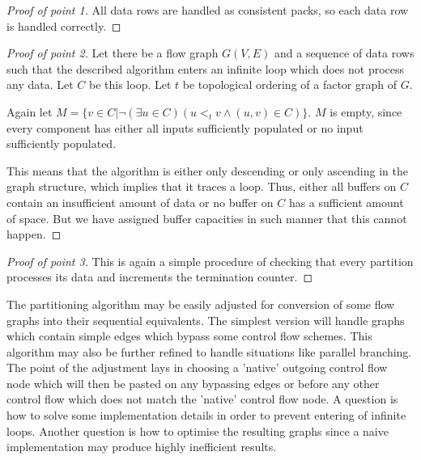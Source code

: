 \begin{proof}[Proof of point 1]
  All data rows are handled as consistent packs, so each data row is handled correctly.
\end{proof}
\begin{proof}[Proof of point 2] Let there be a flow graph $G(V,E)$ and a sequence of data rows such that the described algorithm enters an infinite loop which does not process any data. Let $C$ be this loop. Let $t$ be topological ordering of a factor graph of $G$. 
  \item Again let $M = \{v \in C | \neg (\exists u \in C)( u <_t v \land (u,v) \in C)\}$. $M$ is empty, since every component has either all inputs sufficiently populated or no input sufficiently populated. 
    
    This means that the algorithm is either only descending or only ascending in the graph structure, which implies that it traces a loop. Thus, either all buffers on $C$ contain an insufficient amount of data or no buffer on $C$ has a sufficient amount of space. But we have assigned buffer capacities in such manner that this cannot happen.
\end{proof}
\begin{proof}[Proof of point 3]
  This is again a simple procedure of checking that every partition processes its data and increments the termination counter.
\end{proof}
\myendclaim

\begin{rem} 
  The partitioning algorithm may be easily adjusted for conversion of some flow graphs into their sequential equivalents. The simplest version will handle graphs which contain simple edges which bypass some control flow schemes. This algorithm may also be further refined to handle situations like parallel branching. The point of the adjustment lays in choosing a 'native' outgoing control flow node which will then be pasted on any bypassing edges or before any other control flow which does not match the 'native' control flow node. A question is how to solve some implementation details in order to prevent entering of infinite loops. Another question is how to optimise the resulting graphs since a naive implementation may produce highly inefficient results. 
\end{rem}




